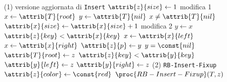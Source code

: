 \begin{codebox}
\zi \Comment (1) versione aggiornata di \texttt{Insert}
\li $\attrib{z}{size} \gets 1$
		\Comment modifica 1
\li $x \gets \attrib{T}{root}$
\li $y \gets \attrib{T}{nil}$ 
\li \While $x \neq \attrib{T}{nil}$
\li \Do
        $\attrib{x}{size} \gets \attrib{x}{size} + 1$
        	\Comment modifica 2
\li     $y \gets x$
\li     \If $\attrib{z}{key} < \attrib{x}{key}$
\li     \Then
            $x \gets \attrib{x}{left}$
\li     \Else
\li         	$x \gets \attrib{x}{right}$
        \End
    \End
\li $\attrib{z}{p} \gets y$
\li \If $y = \const{nil}$
\li \Then
        $\attrib{T}{root} \gets z$
\li \Else 
		\If $\attrib{z}{key} < \attrib{y}{key}$
\li     \Then
            $\attrib{y}{left} \gets z$
\li     \Else
\li        	 $\attrib{y}{right} \gets z$
        \End
    \End
\zi \Comment (2) \texttt{RB-Insert-Fixup}
\li $\attrib{z}{color} \gets \const{red}$
\li $\proc{RB-Insert-Fixup}(T,z)$
\end{codebox}